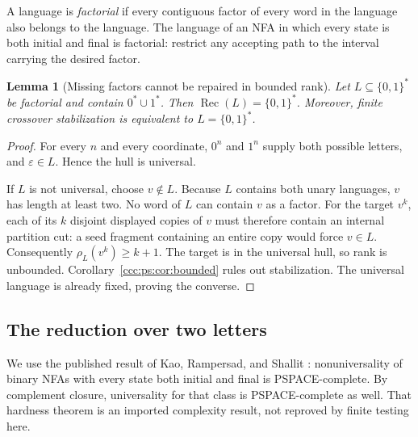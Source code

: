 \documentclass[11pt,letterpaper]{article}
\newtheorem{lemma}[theorem]{Lemma}
\theoremstyle{definition}
\theoremstyle{remark}
\newcommand{\eps}{\varepsilon}
\newcommand{\rec}{\operatorname{Rec}}
\newcommand{\rank}{\rho}
\begin{document}
A language is \emph{factorial} if every contiguous factor of every word
in the language also belongs to the language. The language of an NFA in
which every state is both initial and final is factorial: restrict any
accepting path to the interval carrying the desired factor.

\begin{lemma}[Missing factors cannot be repaired in bounded rank]
\label{ccc:ps:lem:factorial}
Let $L\subseteq\{0,1\}^*$ be factorial and contain $0^*\cup1^*$.
Then $\rec(L)=\{0,1\}^*$. Moreover, finite crossover stabilization is
equivalent to $L=\{0,1\}^*$.
\end{lemma}
\begin{proof}
For every $n$ and every coordinate, $0^n$ and $1^n$ supply both possible
letters, and $\eps\in L$. Hence the hull is universal.

If $L$ is not universal, choose $v\notin L$. Because $L$ contains both
unary languages, $v$ has length at least two. No word of $L$ can contain
$v$ as a factor. For the target $v^k$, each of its $k$ disjoint displayed
copies of $v$ must therefore contain an internal partition cut: a seed
fragment containing an entire copy would force $v\in L$. Consequently
$\rank_L(v^k)\ge k+1$. The target is in the universal hull, so rank is
unbounded. Corollary~\ref{ccc:ps:cor:bounded} rules out stabilization. The
universal language is already fixed, proving the converse.
\end{proof}

\subsection{The reduction over two letters}

We use the published result of Kao, Rampersad, and Shallit
\cite[Lemma~6]{KRS}: nonuniversality of binary NFAs with every state both
initial and final is PSPACE-complete. By complement closure, universality
for that class is PSPACE-complete as well. That hardness theorem is an
imported complexity result, not reproved by finite testing here.
\end{document}
